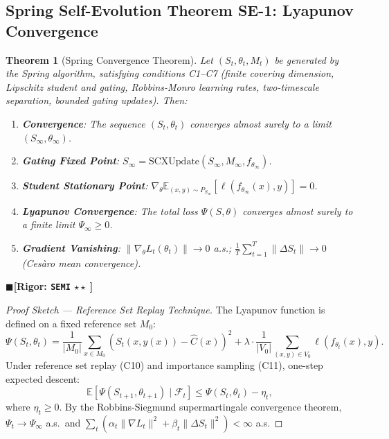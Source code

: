 \documentclass[12pt,a4paper]{article}
\newtheorem{theorem}{Theorem}[section]
\theoremstyle{definition}
\theoremstyle{remark}
\newcommand{\rigorSemi}{$\blacksquare$\;\textbf{[Rigor: \texttt{SEMI} $\star\star\;$]}}
\begin{document}
\subsection{Spring Self-Evolution Theorem SE-1: Lyapunov Convergence}

\begin{theorem}[Spring Convergence Theorem]
\label{thm:se1}
Let $(S_t, \theta_t, M_t)$ be generated by the Spring algorithm, satisfying conditions C1--C7 (finite covering dimension, Lipschitz student and gating, Robbins-Monro learning rates, two-timescale separation, bounded gating updates). Then:
\begin{enumerate}[label=(\alph*)]
\item \textbf{Convergence}: The sequence $(S_t, \theta_t)$ converges almost surely to a limit $(S_\infty, \theta_\infty)$.
\item \textbf{Gating Fixed Point}: $S_\infty = \text{SCXUpdate}(S_\infty, M_\infty, f_{\theta_\infty})$.
\item \textbf{Student Stationary Point}: $\nabla_\theta \mathbb{E}_{(x,y)\sim P_{S_\infty}}[\ell(f_{\theta_\infty}(x), y)] = 0$.
\item \textbf{Lyapunov Convergence}: The total loss $\Psi(S, \theta)$ converges almost surely to a finite limit $\Psi_\infty \geq 0$.
\item \textbf{Gradient Vanishing}: $\|\nabla_\theta L_t(\theta_t)\| \to 0$ a.s.; $\frac{1}{T}\sum_{t=1}^{T}\|\Delta S_t\| \to 0$ (Ces\`{a}ro mean convergence).
\end{enumerate}
\end{theorem}
\rigorSemi

\begin{proof}[Proof Sketch --- Reference Set Replay Technique]
The Lyapunov function is defined on a fixed reference set $M_0$:
\begin{equation}
\Psi(S_t, \theta_t) = \frac{1}{|M_0|}\sum_{x\in M_0}(S_t(x, y(x)) - \hat{C}(x))^2 + \lambda \cdot \frac{1}{|V_0|}\sum_{(x,y)\in V_0}\ell(f_{\theta_t}(x), y).
\end{equation}
Under reference set replay (C10) and importance sampling (C11), one-step expected descent:
\begin{equation}
\mathbb{E}[\Psi(S_{t+1}, \theta_{t+1})\mid\mathcal{F}_t] \leq \Psi(S_t, \theta_t) - \eta_t,
\end{equation}
where $\eta_t \geq 0$. By the Robbins-Siegmund supermartingale convergence theorem, $\Psi_t \to \Psi_\infty$ a.s.\ and $\sum_t (\alpha_t\|\nabla L_t\|^2 + \beta_t\|\Delta S_t\|^2) < \infty$ a.s.
\end{proof}
\end{document}
